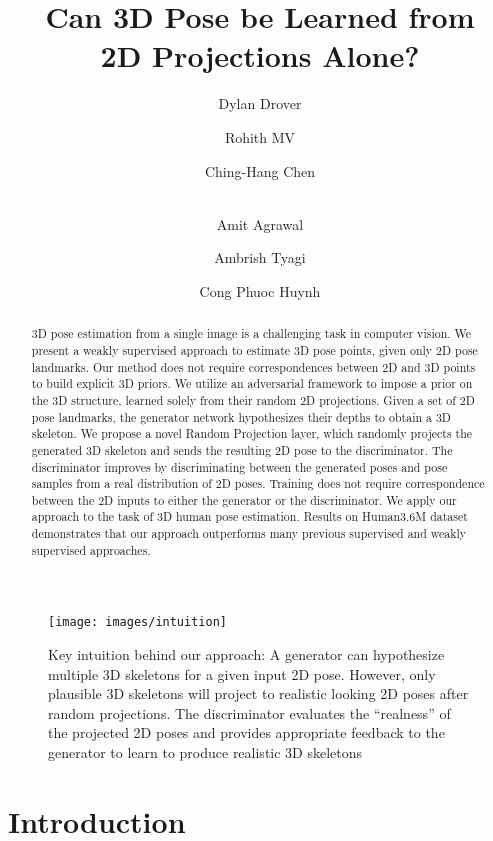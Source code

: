 \documentclass[runningheads]{llncs}
\begin{document}
\title{Can 3D Pose be Learned from \\ 2D Projections Alone?} 


 \author{Dylan Drover \and 
Rohith MV\and
Ching-Hang Chen \and\\ 
Amit Agrawal \and
Ambrish Tyagi \and 
Cong Phuoc Huynh}


\maketitle              %
\begin{abstract}
\label{sect:abstract}

3D pose estimation from a single image is a challenging task in computer vision. We present a weakly supervised approach to estimate 3D pose points, given only 2D pose landmarks. Our method does not require correspondences between 2D and 3D points to build explicit 3D priors. We utilize an adversarial framework to impose a prior on the 3D structure, learned solely from their random 2D projections. Given a set of 2D pose landmarks, the generator network hypothesizes their depths to obtain a 3D skeleton. We propose a novel Random Projection layer, which randomly projects the generated 3D skeleton and sends the resulting 2D pose to the discriminator. The discriminator improves by discriminating between the generated poses and pose samples from a real distribution of 2D poses. Training does not require  correspondence between the 2D inputs to either the generator or the discriminator.
We apply our approach to the task of 3D human pose estimation. Results on Human3.6M dataset demonstrates that our approach outperforms many previous supervised and weakly supervised approaches. 

\end{abstract}

\begin{figure}[t!]
	\centering
	\texttt{[image: images/intuition]}
	\caption{Key intuition behind our approach: A generator can hypothesize multiple 3D skeletons for a given input 2D pose. However, only plausible 3D skeletons will project to realistic looking 2D poses after random projections. The discriminator evaluates the ``realness'' of the projected 2D poses and provides appropriate feedback to the generator to learn to produce realistic 3D skeletons}
	\label{fig:intuition}
\end{figure}\section{Introduction}\label{sect:introduction}
\end{document}
